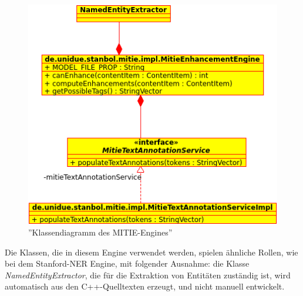\begin{figure}[ht]
\centering
\includegraphics[width=\textwidth]{Bilder/mitie-classes.png}
\caption{''Klassendiagramm  des MITIE-Engines''}
\label{fig:mitieclasses}
\end{figure}
Die Klassen, die in diesem Engine verwendet werden, spielen ähnliche Rollen, wie bei dem Stanford-NER Engine, mit folgender Ausnahme: die Klasse \textit{NamedEntityExtractor}, die für die Extraktion von Entitäten zuständig ist, wird automatisch aus den C++-Quelltexten erzeugt, und nicht manuell entwickelt.

